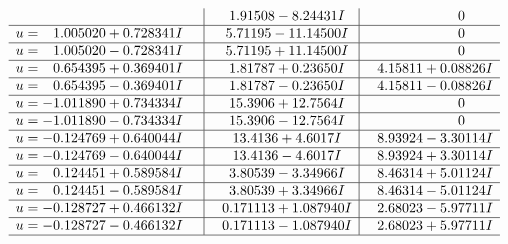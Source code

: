 \documentclass[1p]{elsarticle_modified}
\theoremstyle{definition}
\begin{document}
$$\begin{array}{c|c|c}
 & \phantom{-}1.91508 - 8.24431 I & \phantom{-0.000000 } 0 \\ \hline\begin{aligned}
u &= \phantom{-}1.005020 + 0.728341 I\end{aligned}
 & \phantom{-}5.71195 - 11.14500 I & \phantom{-0.000000 } 0 \\ \hline\begin{aligned}
u &= \phantom{-}1.005020 - 0.728341 I\end{aligned}
 & \phantom{-}5.71195 + 11.14500 I & \phantom{-0.000000 } 0 \\ \hline\begin{aligned}
u &= \phantom{-}0.654395 + 0.369401 I\end{aligned}
 & \phantom{-}1.81787 + 0.23650 I & \phantom{-}4.15811 + 0.08826 I \\ \hline\begin{aligned}
u &= \phantom{-}0.654395 - 0.369401 I\end{aligned}
 & \phantom{-}1.81787 - 0.23650 I & \phantom{-}4.15811 - 0.08826 I \\ \hline\begin{aligned}
u &= -1.011890 + 0.734334 I\end{aligned}
 & \phantom{-}15.3906 + 12.7564 I & \phantom{-0.000000 } 0 \\ \hline\begin{aligned}
u &= -1.011890 - 0.734334 I\end{aligned}
 & \phantom{-}15.3906 - 12.7564 I & \phantom{-0.000000 } 0 \\ \hline\begin{aligned}
u &= -0.124769 + 0.640044 I\end{aligned}
 & \phantom{-}13.4136 + 4.6017 I & \phantom{-}8.93924 - 3.30114 I \\ \hline\begin{aligned}
u &= -0.124769 - 0.640044 I\end{aligned}
 & \phantom{-}13.4136 - 4.6017 I & \phantom{-}8.93924 + 3.30114 I \\ \hline\begin{aligned}
u &= \phantom{-}0.124451 + 0.589584 I\end{aligned}
 & \phantom{-}3.80539 - 3.34966 I & \phantom{-}8.46314 + 5.01124 I \\ \hline\begin{aligned}
u &= \phantom{-}0.124451 - 0.589584 I\end{aligned}
 & \phantom{-}3.80539 + 3.34966 I & \phantom{-}8.46314 - 5.01124 I \\ \hline\begin{aligned}
u &= -0.128727 + 0.466132 I\end{aligned}
 & \phantom{-}0.171113 + 1.087940 I & \phantom{-}2.68023 - 5.97711 I \\ \hline\begin{aligned}
u &= -0.128727 - 0.466132 I\end{aligned}
 & \phantom{-}0.171113 - 1.087940 I & \phantom{-}2.68023 + 5.97711 I\\
 \hline 
 \end{array}$$\newpage
\end{document}
